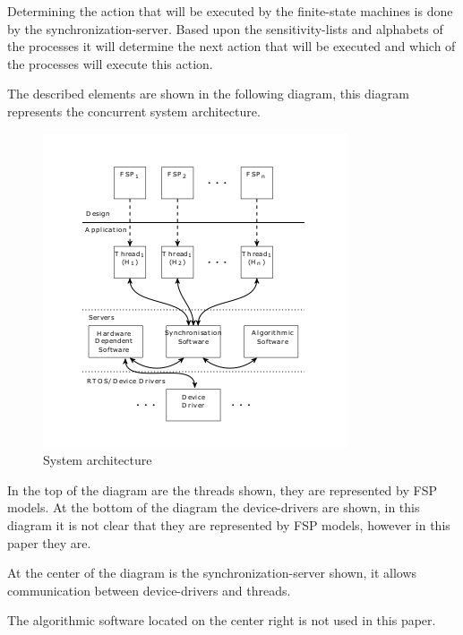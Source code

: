 Determining the action that will be executed by the finite-state
machines is done by the synchronization-server. Based upon the
sensitivity-lists and alphabets of the processes it will determine the
next action that will be executed and which of the processes will
execute this action.

The described elements are shown in the following diagram, this diagram
represents the concurrent system architecture.

\begin{figure}
\centering
\includegraphics{../img/system_architecture.png}
\caption{System architecture}
\end{figure}

In the top of the diagram are the threads shown, they are represented by
FSP models. At the bottom of the diagram the device-drivers are shown,
in this diagram it is not clear that they are represented by FSP models,
however in this paper they are.

At the center of the diagram is the synchronization-server shown, it
allows communication between device-drivers and threads.

The algorithmic software located on the center right is not used in this
paper.
